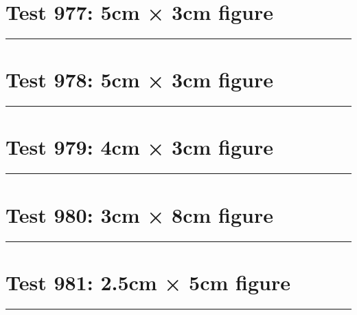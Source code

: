 \documentclass[a4paper,11pt]{article}
\begin{document}
\section*{Test 977: 5cm × 3cm figure}
\begin{swarmwrap}%
  \begin{minipage}[t]{5cm}
    \centering
    \rule{\linewidth}{3cm}
  \end{minipage}%
\end{swarmwrap}%
\swarmwrapnext
\lipsum[15]
\lipsum[16]
\lipsum[17]
\lipsum[18]
\lipsum[19]
\lipsum[20]
\section*{Test 978: 5cm × 3cm figure}
\begin{swarmwrap}%
  \begin{minipage}[t]{5cm}
    \centering
    \rule{\linewidth}{3cm}
  \end{minipage}%
\end{swarmwrap}%
\swarmwrapnext
\lipsum[51]
\lipsum[52]
\lipsum[53]
\lipsum[54]
\lipsum[55]
\lipsum[56]
\section*{Test 979: 4cm × 3cm figure}
\begin{swarmwrap}%
  \begin{minipage}[t]{4cm}
    \centering
    \rule{\linewidth}{3cm}
  \end{minipage}%
\end{swarmwrap}%
\swarmwrapnext
\lipsum[137]
\lipsum[138]
\lipsum[139]
\lipsum[140]
\lipsum[141]
\lipsum[142]
\section*{Test 980: 3cm × 8cm figure}
\begin{swarmwrap}%
  \begin{minipage}[t]{3cm}
    \centering
    \rule{\linewidth}{8cm}
  \end{minipage}%
\end{swarmwrap}%
\swarmwrapnext
\lipsum[40]
\lipsum[41]
\lipsum[42]
\section*{Test 981: 2.5cm × 5cm figure}
\begin{swarmwrap}%
  \begin{minipage}[t]{2cm}
    \centering
    \rule{\linewidth}{5cm}
  \end{minipage}%
\end{swarmwrap}%
\swarmwrapnext
\lipsum[106]
\lipsum[107]
\lipsum[108]
\lipsum[109]
\lipsum[110]
\end{document}
